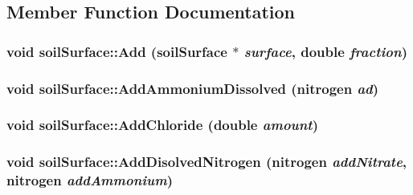 \subsection{Member Function Documentation}
\hypertarget{classsoil_surface_a076f92fc689a98876883f657855fae06}{
\subsubsection[{Add}]{\setlength{\rightskip}{0pt plus 5cm}void soilSurface::Add ({\bf soilSurface} $\ast$ {\em surface}, \/  double {\em fraction})}}
\label{classsoil_surface_a076f92fc689a98876883f657855fae06}
\hypertarget{classsoil_surface_aabff58a0f58d1f4ca7c0fccdc976fa77}{
\subsubsection[{AddAmmoniumDissolved}]{\setlength{\rightskip}{0pt plus 5cm}void soilSurface::AddAmmoniumDissolved ({\bf nitrogen} {\em ad})}}
\label{classsoil_surface_aabff58a0f58d1f4ca7c0fccdc976fa77}
\hypertarget{classsoil_surface_a0a10fcbaeb2dbd98a6098e6a97b6095e}{
\subsubsection[{AddChloride}]{\setlength{\rightskip}{0pt plus 5cm}void soilSurface::AddChloride (double {\em amount})}}
\label{classsoil_surface_a0a10fcbaeb2dbd98a6098e6a97b6095e}
\hypertarget{classsoil_surface_a8ba8e112ccba970c09854d5abcc205b3}{
\subsubsection[{AddDisolvedNitrogen}]{\setlength{\rightskip}{0pt plus 5cm}void soilSurface::AddDisolvedNitrogen ({\bf nitrogen} {\em addNitrate}, \/  {\bf nitrogen} {\em addAmmonium})}}
\label{classsoil_surface_a8ba8e112ccba970c09854d5abcc205b3}
